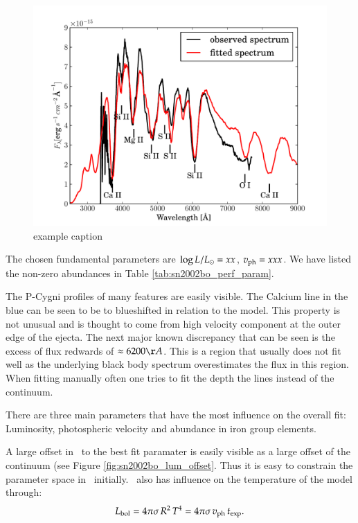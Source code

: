 \begin{figure}[htbp] %
   \centering
   \includegraphics[width=\textwidth]{chapter_dalek/plots/bf2002bo-10.pdf} 
   \caption{example caption}
   \label{fig:sn2002bo-10_bf}
\end{figure}

The chosen fundamental parameters are $\log{L/L_\odot}=xx$, $v_{\rm ph}=xxx$. We have listed the non-zero abundances in Table \ref{tab:sn2002bo_perf_param}. 



The P-Cygni profiles of many features are easily visible. The Calcium line in the blue can be seen to be to blueshifted in relation to the model. This property is not unusual and is thought to come from high velocity component at the outer edge of the ejecta. The next major known discrepancy that can be seen is the excess of flux redwards of  $\approx 6200 \AA$.  This is a region that usually does not fit well as the underlying black body spectrum overestimates the flux in this region. When fitting manually often one tries to fit the depth the lines instead of the continuum.

There are three main parameters that have the most influence on the overall fit: Luminosity, photospheric velocity and abundance in iron group elements.

A large offset in \lum\ to the best fit paramater is easily visible as a large offset of the continuum (see Figure \ref{fig:sn2002bo_lum_offset}. Thus it is easy to constrain the parameter space in \lum\ initially. \lum\ also has influence on the temperature of the model through:
\[
L_{\rm bol} = 4\pi\sigma\, R^2\,T^4 = 4\pi\sigma\,v_{\rm ph}\,t_{\rm exp}.
\label{eq:lum_temp_relation}
\]

